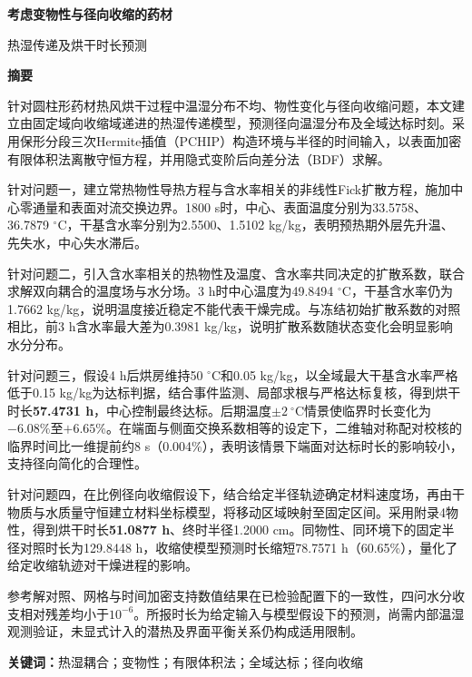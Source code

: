 \begin{center}
{\fontsize{18}{24}\selectfont\bfseries 考虑变物性与径向收缩的药材\par 热湿传递及烘干时长预测}\par
\vspace{0.7em}
{\large\bfseries 摘\quad 要}
\end{center}
针对圆柱形药材热风烘干过程中温湿分布不均、物性变化与径向收缩问题，本文建立由固定域向收缩域递进的热湿传递模型，预测径向温湿分布及全域达标时刻。采用保形分段三次Hermite插值（PCHIP）构造环境与半径的时间输入，以表面加密有限体积法离散守恒方程，并用隐式变阶后向差分法（BDF）求解。

针对问题一，建立常热物性导热方程与含水率相关的非线性Fick扩散方程，施加中心零通量和表面对流交换边界。1800 s时，中心、表面温度分别为33.5758、36.7879 $^\circ$C，干基含水率分别为2.5500、1.5102 kg/kg，表明预热期外层先升温、先失水，中心失水滞后。

针对问题二，引入含水率相关的热物性及温度、含水率共同决定的扩散系数，联合求解双向耦合的温度场与水分场。3 h时中心温度为49.8494 $^\circ$C，干基含水率仍为1.7662 kg/kg，说明温度接近稳定不能代表干燥完成。与冻结初始扩散系数的对照相比，前3 h含水率最大差为0.3981 kg/kg，说明扩散系数随状态变化会明显影响水分分布。

针对问题三，假设4 h后烘房维持50 $^\circ$C和0.05 kg/kg，以全域最大干基含水率严格低于0.15 kg/kg为达标判据，结合事件监测、局部求根与严格达标复核，得到烘干时长\textbf{57.4731 h}，中心控制最终达标。后期温度$\pm2\ ^\circ$C情景使临界时长变化为$-6.08\%$至$+6.65\%$。在端面与侧面交换系数相等的设定下，二维轴对称配对校核的临界时间比一维提前约8 s（0.004\%），表明该情景下端面对达标时长的影响较小，支持径向简化的合理性。

针对问题四，在比例径向收缩假设下，结合给定半径轨迹确定材料速度场，再由干物质与水质量守恒建立材料坐标模型，将移动区域映射至固定区间。采用附录4物性，得到烘干时长\textbf{51.0877 h}、终时半径1.2000 cm。同物性、同环境下的固定半径对照时长为129.8448 h，收缩使模型预测时长缩短78.7571 h（60.65\%），量化了给定收缩轨迹对干燥进程的影响。

参考解对照、网格与时间加密支持数值结果在已检验配置下的一致性，四问水分收支相对残差均小于$10^{-6}$。所报时长为给定输入与模型假设下的预测，尚需内部温湿观测验证，未显式计入的潜热及界面平衡关系仍构成适用限制。

\vspace{0.5em}
\noindent\textbf{关键词：}热湿耦合；变物性；有限体积法；全域达标；径向收缩
